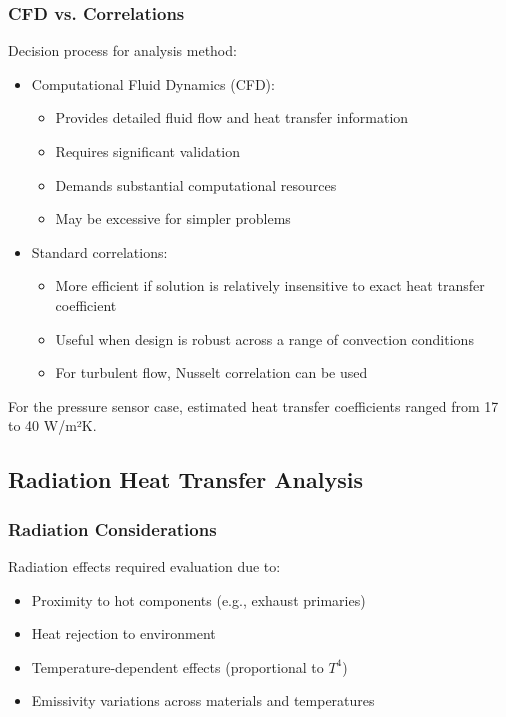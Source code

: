 \subsubsection*{CFD vs. Correlations}

Decision process for analysis method:
\begin{itemize}
    \item Computational Fluid Dynamics (CFD):
    \begin{itemize}
        \item Provides detailed fluid flow and heat transfer information
        \item Requires significant validation
        \item Demands substantial computational resources
        \item May be excessive for simpler problems
    \end{itemize}
    \item Standard correlations:
    \begin{itemize}
        \item More efficient if solution is relatively insensitive to exact heat transfer coefficient
        \item Useful when design is robust across a range of convection conditions
        \item For turbulent flow, Nusselt correlation can be used
    \end{itemize}
\end{itemize}

For the pressure sensor case, estimated heat transfer coefficients ranged from 17 to 40 W/m²K.

\subsection*{Radiation Heat Transfer Analysis}

\subsubsection*{Radiation Considerations}

Radiation effects required evaluation due to:
\begin{itemize}
    \item Proximity to hot components (e.g., exhaust primaries)
    \item Heat rejection to environment
    \item Temperature-dependent effects (proportional to $T^4$)
    \item Emissivity variations across materials and temperatures
\end{itemize}

